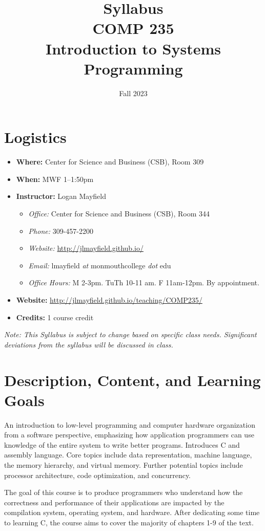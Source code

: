 \documentclass[10pt]{article}
\title{Syllabus \\ COMP 235 \\ Introduction to Systems Programming}
\author{  }
\date{Fall 2023}
\begin{document}
\maketitle

\section{Logistics}
\begin{itemize}
\item \textbf{Where: } Center for Science and Business (CSB), Room 309
\item \textbf{When: } MWF 1--1:50pm
\item \textbf{Instructor: } Logan Mayfield
\begin{itemize}
\item \textit{Office: } Center for Science and Business (CSB), Room 344
\item \textit{Phone: } 309-457-2200 %
\item \textit{Website: } \url{http://jlmayfield.github.io/}
\item \textit{Email: } lmayfield \textit{at} monmouthcollege \textit{dot} edu
\item \textit{Office Hours: }  M 2-3pm. TuTh 10-11 am. F 11am-12pm. By appointment.
\end{itemize}
\item \textbf{Website: } \url{http://jlmayfield.github.io/teaching/COMP235/}
\item \textbf{Credits: } 1 course credit
\end{itemize}
\emph{Note: This Syllabus is subject to change based on specific class needs. Significant deviations from the syllabus will be discussed in class.}


\section{Description, Content, and Learning Goals}

An introduction to low-level programming and computer hardware
organization from a software perspective, emphasizing how application
programmers can use knowledge of the entire system to write better
programs. Introduces C and assembly language. Core topics include data
representation, machine language, the memory hierarchy, and virtual
memory. Further potential topics include processor architecture, code
optimization, and concurrency.

The goal of this course is to produce programmers who understand how
the correctness and performance of their applications are impacted by
the compilation system, operating system, and hardware. After
dedicating some time to learning C, the course aims to cover the
majority of chapters 1-9 of the text.
\end{document}
